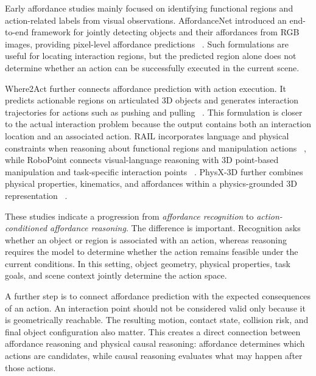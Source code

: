 \documentclass{SCIS2026}
\begin{document}
Early affordance studies mainly focused on identifying functional regions
and action-related labels from visual observations. AffordanceNet introduced
an end-to-end framework for jointly detecting objects and their affordances
from RGB images, providing pixel-level affordance predictions
~\cite{do2018affordancenet}. Such formulations are useful for locating
interaction regions, but the predicted region alone does not determine
whether an action can be successfully executed in the current scene.

Where2Act further connects affordance prediction with action execution. It
predicts actionable regions on articulated 3D objects and generates
interaction trajectories for actions such as pushing and pulling
~\cite{mo2021where2act}. This formulation is closer to the actual
interaction problem because the output contains both an interaction location
and an associated action. RAIL incorporates language and physical
constraints when reasoning about functional regions and manipulation actions
~\cite{zhang2024rail}, while RoboPoint connects visual-language reasoning
with 3D point-based manipulation and task-specific interaction points
~\cite{yuan2024robopoint}. PhysX-3D further combines physical properties,
kinematics, and affordances within a physics-grounded 3D representation
~\cite{cao2025physx3d}.

These studies indicate a progression from \emph{affordance recognition} to
\emph{action-conditioned affordance reasoning}. The difference is important.
Recognition asks whether an object or region is associated with an action,
whereas reasoning requires the model to determine whether the action remains
feasible under the current conditions. In this setting, object geometry,
physical properties, task goals, and scene context jointly determine the
action space.

A further step is to connect affordance prediction with the expected
consequences of an action. An interaction point should not be considered
valid only because it is geometrically reachable. The resulting motion,
contact state, collision risk, and final object configuration also matter.
This creates a direct connection between affordance reasoning and physical
causal reasoning: affordance determines which actions are candidates, while
causal reasoning evaluates what may happen after those actions.


\end{document}

